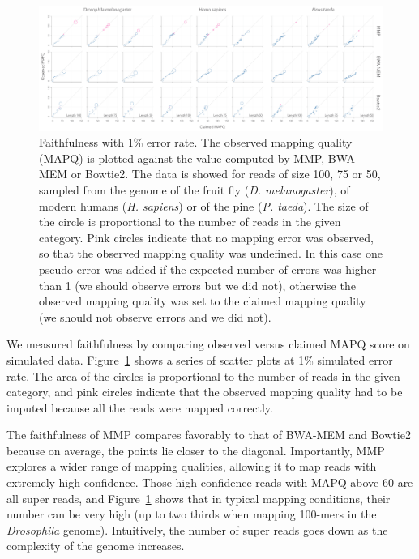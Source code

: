 \documentclass[a4,center,fleqn]{NAR}
\begin{document}
\begin{figure}[t]
\begin{center}
\includegraphics[scale=.24]{fig_faith.pdf}
\end{center}
\caption{Faithfulness with 1\% error rate. The observed mapping quality
(MAPQ) is plotted against the value computed by MMP, BWA-MEM or Bowtie2.
The data is showed for reads of size 100, 75 or 50, sampled from the
genome of the fruit fly (\textit{D. melanogaster}), of modern humans
(\textit{H. sapiens}) or of the pine (\textit{P. taeda}). The size of the
circle is proportional to the number of reads in the given category. Pink
circles indicate that no mapping error was observed, so that the observed
mapping quality was undefined. In this case one pseudo error was added if
the expected number of errors was higher than 1 (we should observe errors
but we did not), otherwise the observed mapping quality was set to the
claimed mapping quality (we should not observe errors and we did not).}
\label{fig_faith}
\end{figure}

We measured faithfulness by comparing observed versus claimed MAPQ score
on simulated data. Figure~\ref{fig_faith} shows a series of scatter plots
at 1\% simulated error rate. The area of the circles is proportional to
the number of reads in the given category, and pink circles indicate that
the observed mapping quality had to be imputed because all the reads were
mapped correctly.

The faithfulness of MMP compares favorably to that of BWA-MEM and Bowtie2
because on average, the points lie closer to the diagonal. Importantly,
MMP explores a wider range of mapping qualities, allowing it to map reads
with extremely high confidence. Those high-confidence reads with MAPQ
above 60 are all super reads, and Figure~\ref{fig_faith} shows that in
typical mapping conditions, their number can be very high (up to two
thirds when mapping 100-mers in the \textit{Drosophila} genome).
Intuitively, the number of super reads goes down as the complexity of the
genome increases.
\end{document}
